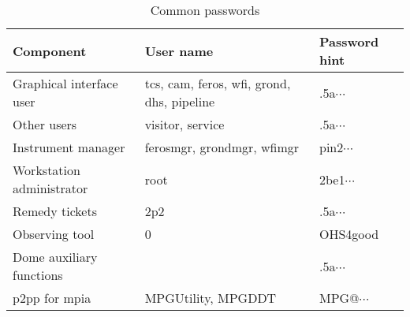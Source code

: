 \documentclass[11pt,fleqn,a4paper]{book}
\begin{document}
\begin{table}
\caption{Common passwords}
\centering
\begin{tabular}{lll}
\hline
Component                 &  User name                                            & Password hint\\
\hline\hline
Graphical interface user  & tcs, cam, feros, wfi, grond, dhs, pipeline & .5a$\cdots$\\
Other users               & \gls{visitor}, \gls{service}               & .5a$\cdots$\\
Instrument manager        & ferosmgr, grondmgr, wfimgr                            & pin2$\cdots$\\
Workstation administrator & root                                                  & 2be1$\cdots$\\
Remedy tickets            & 2p2                                                   & .5a$\cdots$\\
Observing tool            & 0                                                     & OHS4good\\
Dome auxiliary functions  &                                                       & .5a$\cdots$\\
p2pp for \gls{mpia}             & MPGUtility, MPGDDT                                    & MPG@$\cdots$\\
\hline
\end{tabular}
\end{table}
\end{document}
